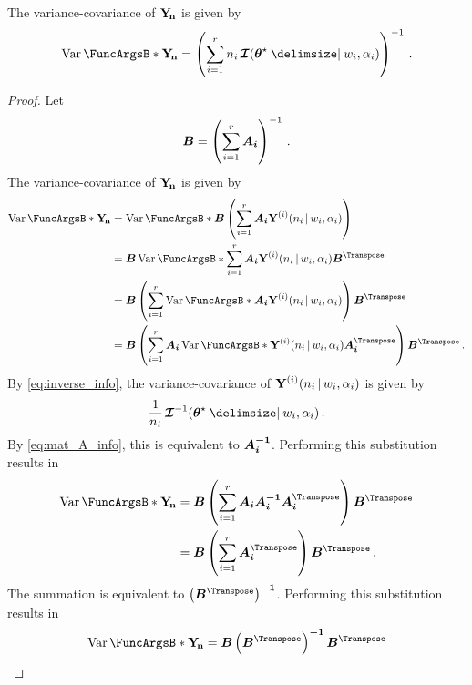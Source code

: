 \documentclass[
    11pt,
    extrafontsizes,
    article,
    oldfontcommands,
    final,
    oneside,
    openany,
    hidelinks]{memoir}
\begin{document}
\begin{theorem}
\label{thm:var_sampdu}
The variance-covariance of $\sampdu$ is given by
\begin{equation}
\label{eq:var_samp_d_full}
    \Var{\sampdu} = \left( \sum_{i=1}^{r} n_i \infomatrx(\tparam\sysparamvec \Given w_i, \alpha_i) \right)^{-1}\,.
\end{equation}
\end{theorem}
\begin{proof}
Let
\begin{equation}
\label{eq:proof_of_var_samp_d_full_mat_B}
    \matrx{B} = \left( \sum_{i=1}^{r} \matrx{A_i} \right)^{-1}\,.
\end{equation}
The variance-covariance of $\sampdu$ is given by
\begin{align}
    \Var{\sampdu}
        &= \Var{\matrx{B} \left( \sum_{i=1}^{r} \matrx{A_i} \sampdir{n_i}{w_i,\alpha_i}{i} \right)}\\
        &= \matrx{B} \Var{\sum_{i=1}^{r} \matrx{A_i} \sampdir{n_i}{w_i,\alpha_i}{i}} \matrx{B^{\Transpose}}\\
        &= \matrx{B} \left(\sum_{i=1}^{r} \Var{\matrx{A_i} 
        \sampdir{n_i}{w_i,\alpha_i}{i}}\right) \matrx{B^{\Transpose}}\\
        &= \matrx{B} \left(\sum_{i=1}^{r} \matrx{A_i} \Var{\sampdir{n_i}{w_i,\alpha_i}{i}} \matrx{A_i^{\Transpose}} \right) 
        \matrx{B^{\Transpose}}\,.
\end{align}
By \cref{eq:inverse_info}, the variance-covariance of $\sampdir{n_i}{w_i,\alpha_i}{i}$ is given by
\begin{equation}
    \frac{1}{n_i} \infomatrx^{-1}(\tparam\sysparamvec \Given w_i, \alpha_i)\,.
\end{equation}
By \cref{eq:mat_A_info}, this is equivalent to $\matrx{A_i^{-1}}$. Performing this substitution results in
\begin{align}
    \Var{\sampdu}
        &= \matrx{B} \left(\sum_{i=1}^{r} \matrx{A_i} \matrx{A_i^{-1}} 
        \matrx{A_i^{\Transpose}} \right) \matrx{B^{\Transpose}}\\
        &= \matrx{B} \left(\sum_{i=1}^{r} \matrx{A_i^{\Transpose}}\right) 
        \matrx{B^{\Transpose}}\,.
\end{align}
The summation is equivalent to $\matrx{\left({B^{\Transpose}}\right)^{-1}}$. 
Performing this substitution results in
\begin{align}
    \Var{\sampdu}
        &= \matrx{B} \matrx{\left(B^{\Transpose}\right)^{-1}} 
        \matrx{B^{\Transpose}}\\

\end{align}
\end{proof}
\end{document}
